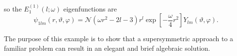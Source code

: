 so the $E^{(1)}_1(l;\omega)$ eigenfunctions are
$$\psi_{1lm}(r,\vartheta,\varphi) = \mathcal{N}(\omega r^2-2l-3)r^{l}\exp
\left[-\frac{\omega}{4}r^2\right]Y_{lm}(\vartheta,\varphi).$$

The purpose of this example is to show that a supersymmetric approach to a familiar problem
can result in an elegant and brief algebraic solution.
\newpage
